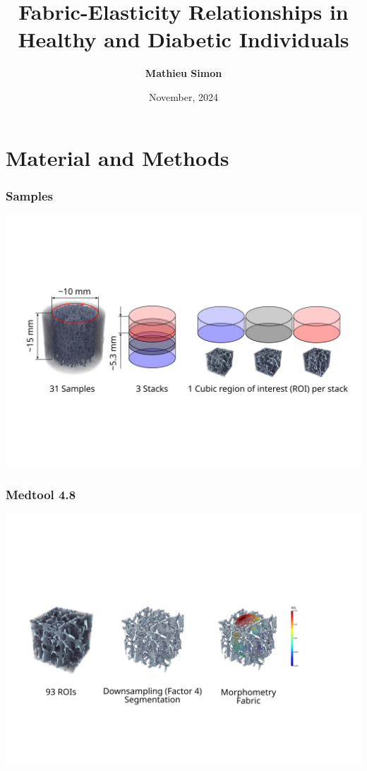 \documentclass[xcolor=table,11pt]{beamer}
\title[DIAFAB]{Fabric-Elasticity Relationships in Healthy and Diabetic Individuals}
\author[mathieu.simon@unibe.ch]{\tiny{\bf{Mathieu Simon}}}
\date{November, 2024}
\begin{document}
	
	\begin{frame}
		\titlepage
	\end{frame}
	
	
	\section{Material and Methods}

	\begin{frame}
		\frametitle{Samples}
		\includegraphics[width=\linewidth]{Pictures/Material}\\
	\end{frame}

	\begin{frame}
		\frametitle{Medtool 4.8}
		\includegraphics[width=\linewidth]{Pictures/Medtool}\\
	\end{frame}
\end{document}
